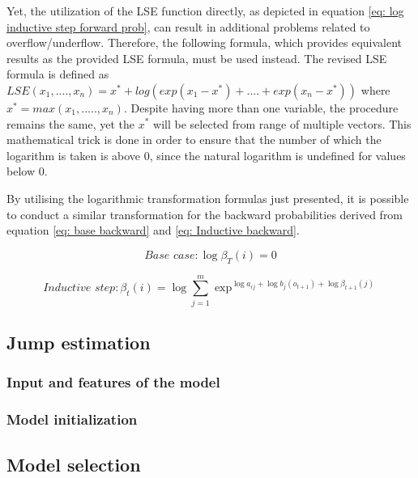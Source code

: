 Yet, the utilization of the LSE function directly, as depicted in equation \ref{eq: log inductive step forward prob}, can result in additional problems related to overflow/underflow. Therefore, the following formula, which provides equivalent results as the provided LSE formula, must be used instead. The revised LSE formula is defined as $LSE(x_1,....,x_n) = x^* + log(exp(x_1-x^*)+....+exp(x_n-x^*))$ where $x^* = max(x_1,.....,x_n)$. Despite having more than one variable, the procedure remains the same, yet the $x^*$ will be selected from range of multiple vectors. This mathematical trick is done in order to ensure that the number of which the logarithm is taken is above 0, since the natural logarithm is undefined for values below 0. 

By utilising the logarithmic transformation formulas just presented, it is possible to conduct a similar transformation for the backward probabilities derived from equation \ref{eq: base backward} and \ref{eq: Inductive backward}. 

\begin{equation}
     \textit{Base case}: \log\beta_T(i) = 0
    \label{eq: log base backward}
\end{equation}

\begin{equation}
    \textit{Inductive step}: \beta_t(i) = \log\sum_{j=1}^m \exp^{\log a_{ij}+\log b_j(o_{t+1})+\log \beta_{t+1}(j)}
    \label{eq: log inductive backward}
\end{equation}








\subsection{Jump estimation}
\label{subsection: Jump theory}

\subsubsection{Input and features of the model}

\subsubsection{Model initialization}
 
 
\subsection*{Model selection}